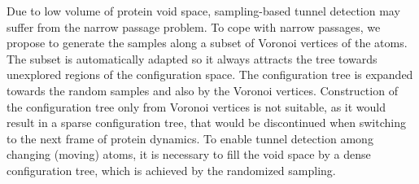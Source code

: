 \documentclass{llncs}
\begin{document}
Due to low volume of protein void space, sampling-based tunnel detection may suffer from the narrow passage problem.
To cope with narrow passages, we propose to generate the samples along a subset of Voronoi vertices of the atoms.
The subset is automatically adapted so it always attracts the tree towards unexplored regions of the configuration space.
The configuration tree is expanded towards the random samples and also by the Voronoi vertices.
Construction of the configuration tree only from Voronoi vertices is not suitable, as it would result in a sparse configuration tree, that would be discontinued when switching to the next frame of protein dynamics.
To enable tunnel detection among changing (moving) atoms, it is necessary to fill the void space by a dense configuration tree, which
is achieved by the randomized sampling.





\end{document}
